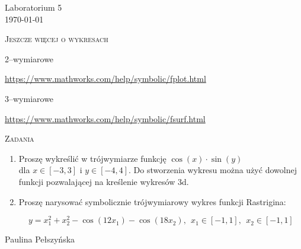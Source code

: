 \documentclass[12pt]{amsbook}
\newenvironment{bottompar}{\par\vspace*{\fill}}{\clearpage}
\theoremstyle{definition}
\begin{document}
\begin{center}
\large{Laboratorium 5}\\
\today
\end{center}

\hspace{3cm}

\begin{center}
\textsc{Jeszcze więcej o wykresach}\\
\end{center}

\hspace{3cm}


\begin{center}
2--wymiarowe\\
\end{center}

\url{https://www.mathworks.com/help/symbolic/fplot.html}



\hspace{3cm}


\begin{center}
3--wymiarowe\\
\end{center}

\url{https://www.mathworks.com/help/symbolic/fsurf.html}



\hspace{3cm}

\begin{center}
\textsc{Zadania}\\
\end{center}

\begin{enumerate}

\item Proszę wykreślić w trójwymiarze funkcję $\cos(x) \cdot \sin(y)$ \\
dla $x \in [-3,3]$ i $y \in [-4,4]$.
 Do stworzenia wykresu można użyć dowolnej funkcji pozwalającej na kreślenie
wykresów 3d.

\item Proszę narysować symbolicznie trójwymiarowy wykres funkcji Rastrigina:

$$ y = x_1^2 + x_2^2 - \cos(12x_1) - \cos (18x_2), \ \ x_1 \in [-1,1], \ \ x_2 \in [-1,1]$$

\end{enumerate}


\begin{bottompar}
\begin{flushright}
Paulina Pełszyńska
\end{flushright}
\end{bottompar}
\end{document}
